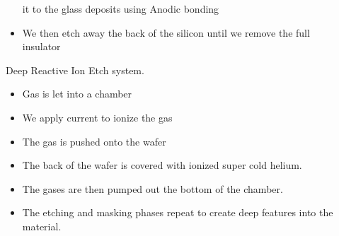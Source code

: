 \documentclass{report}
\begin{document}
\begin{description}
\begin{mdframed}
\begin{itemize}
                    it to the glass deposits using
                    Anodic bonding
                \item We then etch away the back of the
                    silicon until we remove the full
                    insulator
            \end{itemize}
            Deep Reactive Ion Etch system.
            \begin{itemize}
                \item Gas is let into a chamber
                \item We apply current to ionize the gas
                \item The gas is pushed onto the wafer
                \item The back of the wafer is covered with
                    ionized super cold helium.
                \item The gases are then pumped out the bottom
                    of the chamber.
                \item The etching and masking phases repeat to
                    create deep features into the material.
            \end{itemize}
        \end{mdframed}
\end{description}
\end{document}
